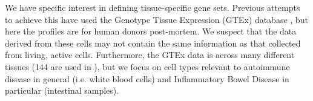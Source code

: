 \documentclass[12pt]{article} %
\begin{document}
%	
	
	
	We have specific interest in defining tissue-specific gene sets. Previous attempts to achieve this have used the Genotype Tissue Expression (GTEx) \cite{GTExConsortiumGeneticeffectsgene2017} database \cite{LonsdaleGenotypeTissueExpressionGTEx2013}, but here the profiles are for human donors
	post-mortem. We suspect that the data derived from these cells may not contain the same information as that collected from living, active cells. Furthermore, the GTEx data is across many different tissues (144 are used in \cite{LonsdaleGenotypeTissueExpressionGTEx2013}), but we focus on cell types relevant to autoimmune disease in general (i.e. white blood cells) and Inflammatory Bowel Disease in particular (intestinal samples).
	
\end{document}
